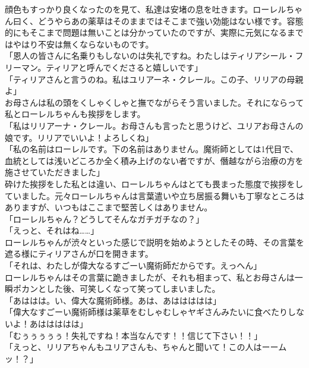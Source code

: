 \documentclass[oneside, a4paper]{jsbook}
\begin{document}
顔色もすっかり良くなったのを見て、私達は安堵の息を吐きます。ローレルちゃん曰く、どうやらあの薬草はそのままではそこまで強い効能はない様です。容態的にもそこまで問題は無いことは分かっていたのですが、実際に元気になるまではやはり不安は無くならないものです。\\

\noindent
「恩人の皆さんに名乗りもしないのは失礼ですね。わたしはティリアシール・フリーマン。ティリアと呼んでくださると嬉しいです」\\
「ティリアさんと言うのね。私はユリアーネ・クレール。この子、リリアの母親よ」\\

お母さんは私の頭をくしゃくしゃと撫でながらそう言いました。それにならって私とローレルちゃんも挨拶をします。\\

\noindent
「私はリリアーナ・クレール。お母さんも言ったと思うけど、ユリアお母さんの娘です。リリアでいいよ！よろしくね」\\
「私の名前はローレルです。下の名前はありません。魔術師としては1代目で、血統としては浅いどころか全く積み上げのない者ですが、僭越ながら治療の方を施させていただきました」\\

砕けた挨拶をした私とは違い、ローレルちゃんはとても畏まった態度で挨拶をしていました。元々ローレルちゃんは言葉遣いや立ち居振る舞いも丁寧なところはありますが、いつもはここまで堅苦しくはありません。\\

\noindent
「ローレルちゃん？どうしてそんなガチガチなの？」\\
「えっと、それはね……」\\

ローレルちゃんが渋々といった感じで説明を始めようとしたその時、その言葉を遮る様にティリアさんが口を開きます。\\

「それは、わたしが偉大なるすごーい魔術師だからです。えっへん」\\

ローレルちゃんはその言葉に跪きましたが、それも相まって、私とお母さんは一瞬ポカンとした後、可笑しくなって笑ってしまいました。\\

\noindent
「あははは。い、偉大な魔術師様。あは、あははははは」\\
「偉大なすごーい魔術師様は薬草をむしゃむしゃヤギさんみたいに食べたりしないよ！あははははは」\\
「むぅぅぅぅぅ！失礼ですね！本当なんです！！信じて下さい！！」\\
「えっと、リリアちゃんもユリアさんも、ちゃんと聞いて！この人はーームッ！？」\\
\end{document}
